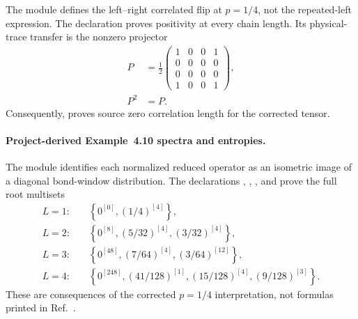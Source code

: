 \documentclass{article}
\begin{document}
The module  defines the
left--right correlated flip at $p=1/4$, not the repeated-left expression. The
declaration  proves
positivity at every chain length. Its physical-trace transfer is the nonzero
projector
\begin{align}
    P
        &= \frac12
        \begin{pmatrix}
            1&0&0&1\\
            0&0&0&0\\
            0&0&0&0\\
            1&0&0&1
        \end{pmatrix},
    \label{eq:cpsv16_examples_4_10_4_11_entropy_example410_transfer_projector}\\
    P^2
        &= P.
    \label{eq:cpsv16_examples_4_10_4_11_entropy_example410_transfer_idempotence}
\end{align}
Consequently,
 proves source zero
correlation length for the corrected tensor.

\paragraph{Project-derived Example~4.10 spectra and entropies.}

The module  identifies each
normalized reduced operator as an isometric image of a diagonal bond-window
distribution. The declarations
,
,
, and
 prove the full
root multisets
\begin{align}
    L=1:\quad
    &\left\{0^{[0]},(1/4)^{[4]}\right\},
    \label{eq:cpsv16_examples_4_10_4_11_entropy_example410_full_roots_one}\\
    L=2:\quad
    &\left\{0^{[8]},(5/32)^{[4]},(3/32)^{[4]}\right\},
    \label{eq:cpsv16_examples_4_10_4_11_entropy_example410_full_roots_two}\\
    L=3:\quad
    &\left\{0^{[48]},(7/64)^{[4]},(3/64)^{[12]}\right\},
    \label{eq:cpsv16_examples_4_10_4_11_entropy_example410_full_roots_three}\\
    L=4:\quad
    &\left\{0^{[248]},(41/128)^{[1]},(15/128)^{[4]},
        (9/128)^{[3]}\right\}.
    \label{eq:cpsv16_examples_4_10_4_11_entropy_example410_full_roots_four}
\end{align}
These are consequences of the corrected $p=1/4$ interpretation, not formulas
printed in Ref.~\cite{Cirac2016MPDO_arXiv}.
\end{document}

